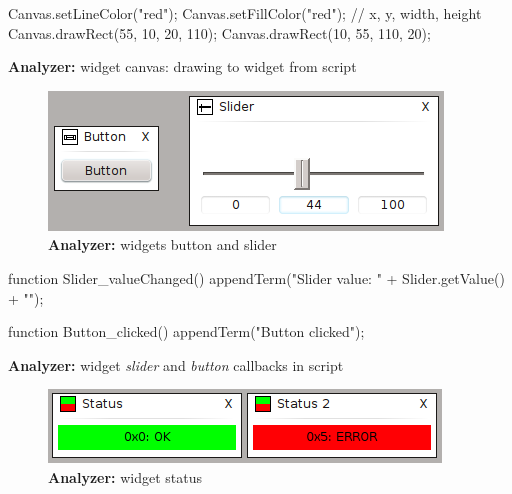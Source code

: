 \documentclass[12pt, a4paper, oneside]{article}
\newcommand{\B}{\textbf} %
\newcommand{\It}{\textit}  %
\begin{document}
\begin{listing}[H]
\begin{jscode}
Canvas.setLineColor("red");
Canvas.setFillColor("red");
// x, y, width, height
Canvas.drawRect(55, 10, 20, 110);
Canvas.drawRect(10, 55, 110, 20);
\end{jscode}
\caption{\B{Analyzer:} widget canvas: drawing to widget from script}
\end{listing}

\begin{figure}[H]
\begin{center}
\includegraphics[scale=1]{../img/w_btn_slider.png}
\caption{\B{Analyzer:} widgets button and slider}
\end{center}
\end{figure}

\begin{listing}[H]
\begin{jscode}
function Slider_valueChanged() {
    appendTerm("Slider value: " + Slider.getValue() + "\n");
}

function Button_clicked() {
    appendTerm("Button clicked\n");
}
\end{jscode}
\caption{\B{Analyzer:} widget \It{slider} and \It{button} callbacks in script}
\end{listing}

\begin{figure}[H]
\begin{center}
\includegraphics[scale=1]{../img/w_status.png}
\caption{\B{Analyzer:} widget status}
\end{center}
\end{figure}
\end{document}
